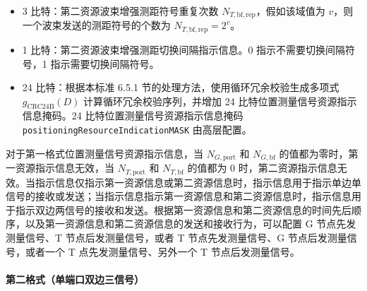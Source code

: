 \documentclass[11pt,a4paper]{ctexart}
\begin{document}
\begin{itemize}[nosep]
  \item 3 比特：第二资源波束增强测距符号重复次数 $N_{T,\mathrm{bf,rep}}$，假如该域值为 $v$，则一个波束发送的测距符号的个数为 $N_{T,\mathrm{bf,rep}} = 2^v$。
  \item 1 比特：第二资源波束增强测距切换间隔指示信息。0 指示不需要切换间隔符号，1 指示需要切换间隔符号。
  \item 24 比特：根据本标准 6.5.1 节的处理方法，使用循环冗余校验生成多项式 $g_{\mathrm{CRC24B}}(D)$ 计算循环冗余校验序列，并增加 24 比特位置测量信号资源指示信息掩码。24 比特位置测量信号资源指示信息掩码 \texttt{positioningResourceIndicationMASK} 由高层配置。
\end{itemize}

对于第一格式位置测量信号资源指示信息，当 $N_{G,\mathrm{port}}$ 和 $N_{G,\mathrm{bf}}$ 的值都为零时，第一资源指示信息无效，当 $N_{T,\mathrm{port}}$ 和 $N_{T,\mathrm{bf}}$ 的值都为 0 时，第二资源指示信息无效。当指示信息仅指示第一资源信息或第二资源信息时，指示信息用于指示单边单信号的接收或发送；当指示信息指示第一资源信息和第二资源信息时，指示信息用于指示双边两信号的接收和发送。根据第一资源信息和第二资源信息的时间先后顺序，以及第一资源信息和第二资源信息的发送和接收行为，可以配置 G 节点先发测量信号、T 节点后发测量信号，或者 T 节点先发测量信号、G 节点后发测量信号，或者一个 T 点先发测量信号、另外一个 T 节点后发测量信号。

\paragraph{第二格式（单端口双边三信号）}
\end{document}
